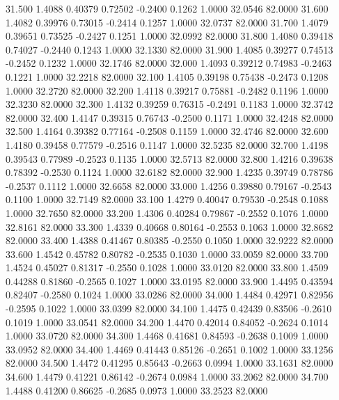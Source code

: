   31.500   1.4088   0.40379   0.72502  -0.2400   0.1262   1.0000  32.0546  82.0000
  31.600   1.4082   0.39976   0.73015  -0.2414   0.1257   1.0000  32.0737  82.0000
  31.700   1.4079   0.39651   0.73525  -0.2427   0.1251   1.0000  32.0992  82.0000
  31.800   1.4080   0.39418   0.74027  -0.2440   0.1243   1.0000  32.1330  82.0000
  31.900   1.4085   0.39277   0.74513  -0.2452   0.1232   1.0000  32.1746  82.0000
  32.000   1.4093   0.39212   0.74983  -0.2463   0.1221   1.0000  32.2218  82.0000
  32.100   1.4105   0.39198   0.75438  -0.2473   0.1208   1.0000  32.2720  82.0000
  32.200   1.4118   0.39217   0.75881  -0.2482   0.1196   1.0000  32.3230  82.0000
  32.300   1.4132   0.39259   0.76315  -0.2491   0.1183   1.0000  32.3742  82.0000
  32.400   1.4147   0.39315   0.76743  -0.2500   0.1171   1.0000  32.4248  82.0000
  32.500   1.4164   0.39382   0.77164  -0.2508   0.1159   1.0000  32.4746  82.0000
  32.600   1.4180   0.39458   0.77579  -0.2516   0.1147   1.0000  32.5235  82.0000
  32.700   1.4198   0.39543   0.77989  -0.2523   0.1135   1.0000  32.5713  82.0000
  32.800   1.4216   0.39638   0.78392  -0.2530   0.1124   1.0000  32.6182  82.0000
  32.900   1.4235   0.39749   0.78786  -0.2537   0.1112   1.0000  32.6658  82.0000
  33.000   1.4256   0.39880   0.79167  -0.2543   0.1100   1.0000  32.7149  82.0000
  33.100   1.4279   0.40047   0.79530  -0.2548   0.1088   1.0000  32.7650  82.0000
  33.200   1.4306   0.40284   0.79867  -0.2552   0.1076   1.0000  32.8161  82.0000
  33.300   1.4339   0.40668   0.80164  -0.2553   0.1063   1.0000  32.8682  82.0000
  33.400   1.4388   0.41467   0.80385  -0.2550   0.1050   1.0000  32.9222  82.0000
  33.600   1.4542   0.45782   0.80782  -0.2535   0.1030   1.0000  33.0059  82.0000
  33.700   1.4524   0.45027   0.81317  -0.2550   0.1028   1.0000  33.0120  82.0000
  33.800   1.4509   0.44288   0.81860  -0.2565   0.1027   1.0000  33.0195  82.0000
  33.900   1.4495   0.43594   0.82407  -0.2580   0.1024   1.0000  33.0286  82.0000
  34.000   1.4484   0.42971   0.82956  -0.2595   0.1022   1.0000  33.0399  82.0000
  34.100   1.4475   0.42439   0.83506  -0.2610   0.1019   1.0000  33.0541  82.0000
  34.200   1.4470   0.42014   0.84052  -0.2624   0.1014   1.0000  33.0720  82.0000
  34.300   1.4468   0.41681   0.84593  -0.2638   0.1009   1.0000  33.0952  82.0000
  34.400   1.4469   0.41443   0.85126  -0.2651   0.1002   1.0000  33.1256  82.0000
  34.500   1.4472   0.41295   0.85643  -0.2663   0.0994   1.0000  33.1631  82.0000
  34.600   1.4479   0.41221   0.86142  -0.2674   0.0984   1.0000  33.2062  82.0000
  34.700   1.4488   0.41200   0.86625  -0.2685   0.0973   1.0000  33.2523  82.0000
